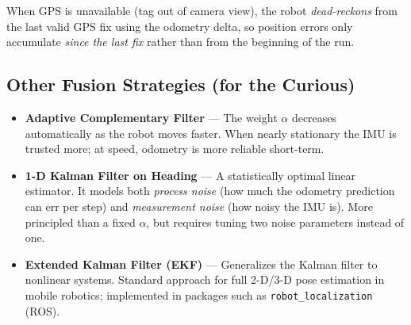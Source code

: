 \documentclass[12pt,letterpaper]{article}
\begin{document}
When GPS is unavailable (tag out of camera view), the robot
\emph{dead-reckons} from the last valid GPS fix using the odometry delta,
so position errors only accumulate \emph{since the last fix} rather than from
the beginning of the run.

\subsection{Other Fusion Strategies (for the Curious)}


\begin{itemize}
  \item \textbf{Adaptive Complementary Filter} ---
        The weight $\alpha$ decreases automatically as the robot moves faster.
        When nearly stationary the IMU is trusted more; at speed,
        odometry is more reliable short-term.

  \item \textbf{1-D Kalman Filter on Heading} ---
        A statistically optimal linear estimator. It models both
        \textit{process noise} (how much the odometry prediction can err per
        step) and \textit{measurement noise} (how noisy the IMU is).
        More principled than a fixed $\alpha$, but requires tuning two noise
        parameters instead of one.

  \item \textbf{Extended Kalman Filter (EKF)} ---
        Generalizes the Kalman filter to nonlinear systems. Standard approach
        for full 2-D/3-D pose estimation in mobile robotics; implemented in
        packages such as \texttt{robot\_localization} (ROS).
\end{itemize}




\newpage

\end{document}
